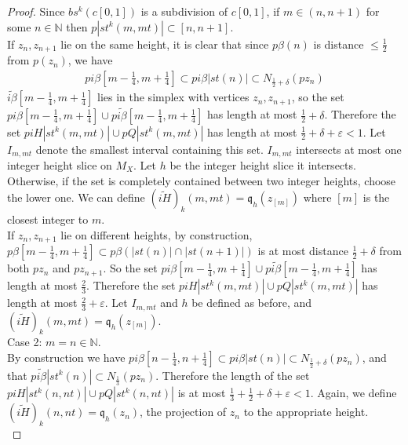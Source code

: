 \documentclass[a4paper,11pt]{article}
\theoremstyle{definition}
\theoremstyle{plain}
\theoremstyle{remark}
\begin{document}
{\begin{proof}
Since $bs^{k}(c[0,1])$ is a subdivision of $c[0,1]$, if $m\in (n,n+1)$ for some $n \in \mathbb{N}$ then $p |st^{k}(m,mt)| \subset [n,n+1]$.\\

If $z_{n}, z_{n+1}$ lie on the same height, it is clear that since $p\beta(n)$ is distance $\leq \frac{1}{2}$ from $p(z_n)$, we have 
\begin{align*}
pi\beta [m-\frac{1}{4}, m+\frac{1}{4}] \subset pi\beta |st(n)| \subset N_{\frac{1}{2}+\delta}(pz_{n}) 
\end{align*}
$\widetilde{i\beta}[m-\frac{1}{4}, m+\frac{1}{4}]$ lies in the simplex with vertices $z_{n},z_{n+1}$, so the set $pi\beta[m-\frac{1}{4}, m+\frac{1}{4}]  \cup p\widetilde{i\beta} [m-\frac{1}{4}, m+\frac{1}{4}] $ has length at most $\frac{1}{2}+\delta$. Therefore the set $p iH |st^{k}(m,mt)| \cup p Q |st^{k}(m,mt)|$ has length at most $\frac{1}{2}+\delta +\varepsilon <1$. Let $I_{m,mt}$ denote the smallest interval containing this set. $I_{m,mt}$ intersects at most one integer height slice on $M_{X}$.  Let $h$ be the integer height slice it intersects. Otherwise, if the set is completely contained between two integer heights, choose the lower one. We can define $(\widetilde{iH})_{k}(m,mt) = \mathfrak{q}_{h}(z_{[m]})$ where $[m]$ is the closest integer to $m$. \\

If $z_{n}, z_{n+1}$ lie on different heights, by construction, $p\beta[m-\frac{1}{4}, m+\frac{1}{4}] \subset p\beta (|st(n)|\cap|st(n+1)|)$ is at most distance $\frac{1}{2}+\delta$ from both $pz_{n}$ and $pz_{n+1}$. So the set $pi\beta [m-\frac{1}{4}, m+\frac{1}{4}]  \cup p\widetilde{i\beta}[m-\frac{1}{4}, m+\frac{1}{4}] $ has length at most $\frac{2}{3}$. Therefore the set  $p iH |st^{k}(m,mt)| \cup p Q |st^{k}(m,mt)|$ has length at most  $\frac{2}{3}+\varepsilon$. Let $I_{m,mt}$ and $h$ be defined as before, and $(\widetilde{iH})_{k}(m,mt) = \mathfrak{q}_{h}(z_{[m]})$.\\


Case 2: $m=n \in \mathbb{N}$.\\

By construction we have $pi\beta [n-\frac{1}{4}, n+\frac{1}{4}]  \subset pi\beta |st(n)| \subset N_{\frac{1}{2}+\delta} (pz_{n})$, and that $p\widetilde{i\beta}|st^{k}(n)| \subset N_{\frac{1}{3}}(pz_{n})$. Therefore the length of the set $piH |st^{k}(n,nt)| \cup pQ|st^{k}(n,nt)|$ is at most $\frac{1}{3}+\frac{1}{2}+\delta +\varepsilon<1$. Again, we define $(\widetilde{iH})_{k}(n,nt) = \mathfrak{q}_{h} (z_n)$, the projection of $z_n$ to the appropriate height.\\ 




\end{proof}}
\end{document}

